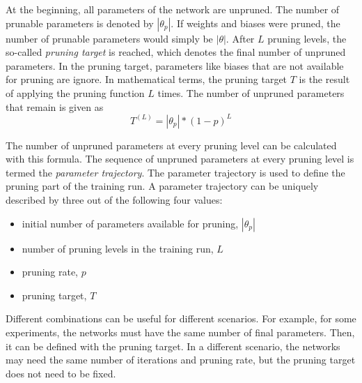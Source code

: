 At the beginning, all parameters of the network are unpruned.
The number of prunable parameters is denoted by $|\theta_p|$.
If weights and biases were pruned, the number of prunable parameters would simply be $|\theta|$.
After $L$ pruning levels, the so-called \textit{pruning target} is reached, which denotes the final number of unpruned parameters.
In the pruning target, parameters like biases that are not available for pruning are ignore.
In mathematical terms, the pruning target $T$ is the result of applying the pruning function $L$ times.
The number of unpruned parameters that remain is given as
\[ T^{(L)} = |\theta_p| * {(1-p)}^L \]

The number of unpruned parameters at every pruning level can be calculated with this formula.
The sequence of unpruned parameters at every pruning level is termed the \textit{parameter trajectory}.
The parameter trajectory is used to define the pruning part of the training run.
A parameter trajectory can be uniquely described by three out of the following four values:
\begin{itemize}
    \item initial number of parameters available for pruning, $|\theta_p|$
    \item number of pruning levels in the training run, $L$
    \item pruning rate, $p$
    \item pruning target, $T$
\end{itemize}
Different combinations can be useful for different scenarios.
For example, for some experiments, the networks must have the same number of final parameters.
Then, it can be defined with the pruning target.
In a different scenario, the networks may need the same number of iterations and pruning rate, but the pruning target does not need to be fixed.

